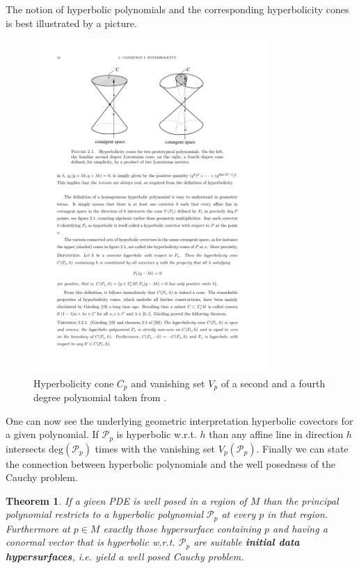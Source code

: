 \documentclass[a4paper,12pt, DIV=14, BCOR=5mm, twoside, headsepline]{scrbook}
\newtheorem{theorem}{Theorem}[section]
\begin{document}
The notion of hyperbolic polynomials and the corresponding hyperbolicity cones is best illustrated by a picture. 
\begin{figure}[ht]
    \centering
    \includegraphics[width=0.8\textwidth]{Poly.pdf}
    \caption{Hyperbolicity cone $C_p$ and vanishing set $V_p$ of a second and a fourth degree polynomial taken from \cite{Rivera}.}
    \label{hyperbol}
\end{figure}
One can now see the underlying geometric interpretation hyperbolic covectors for a given polynomial. If $\mathcal{P}_p$ is hyperbolic w.r.t. $h$ than any affine line in direction $h$ intersects $\mathrm{deg}(\mathcal{P}_p)$ times with the vanishing set $V_p(\mathcal{P}_p)$.
Finally we can state the connection between hyperbolic polynomials and the well posedness of the Cauchy problem.
\begin{theorem}
If a given PDE is well posed in a region of $M$ than the principal polynomial restricts to a hyperbolic polynomial $\mathcal{P}_p$ at every $p$ in that region. Furthermore at $p \in M$ exactly those hypersurface containing $p$ and having a conormal vector that is hyperbolic w.r.t. $\mathcal{P}_p$ are suitable \textit{\textbf{initial data hypersurfaces}}, i.e. yield a well posed Cauchy problem.
\end{theorem}
\end{document}
